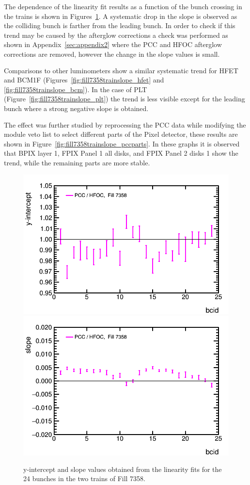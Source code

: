 The dependence of the linearity fit results as a function of  the bunch crossing in the trains is shown in Figures~\ref{fig:fill7358trainresults}.
A systematic drop in the slope is observed as the colliding bunch is farther from the leading bunch.
In order to check if this trend may be caused by the afterglow corrections a check was performed as shown in Appendix~\ref{sec:appendix2} where the PCC and HFOC afterglow corrections are removed, however the change in the slope values is small.

Comparisons to other luminometers show a similar systematic trend for HFET and BCM1F (Figures~\ref{fig:fill7358trainslope_hfet} and \ref{fig:fill7358trainslope_bcm}).
In the case of PLT (Figure~\ref{fig:fill7358trainslope_plt}) the trend is less visible except for the leading bunch where a strong negative slope is obtained.

The effect was further studied by reprocessing the PCC data while modifying the module veto list to select different parts of the Pixel detector, these results are shown in Figure~\ref{fig:fill7358trainslope_pccparts}.
In these graphs it is observed that BPIX layer 1, FPIX Panel 1 all disks, and FPIX Panel 2 disks 1 show the trend, while the remaining parts are more stable.

\begin{figure}[t]
  \begin{center}
    \includegraphics[width=0.47\linewidth]{plots/sbilratios_trains_Fill7358/plot_det_linearity_perbx_y0_7358.png}
    \includegraphics[width=0.47\linewidth]{plots/sbilratios_trains_Fill7358/plot_det_linearity_perbx_slope_7358.png}
    \caption{
      y-intercept and slope values obtained from the linearity fits for the 24 bunches in the two trains of Fill 7358.
      \label{fig:fill7358trainresults}
    }
  \end{center}
\end{figure}



